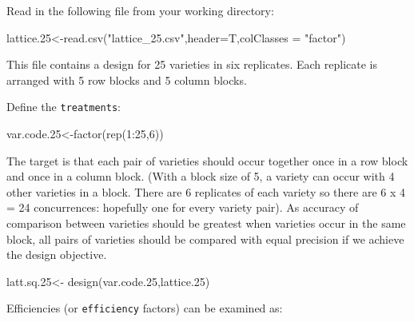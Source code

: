 \documentclass[
]{book}
\newenvironment{Shaded}{\begin{snugshade}}{\end{snugshade}}
\newcommand{\AttributeTok}[1]{\textcolor[rgb]{0.77,0.63,0.00}{#1}}
\newcommand{\DecValTok}[1]{\textcolor[rgb]{0.00,0.00,0.81}{#1}}
\newcommand{\FloatTok}[1]{\textcolor[rgb]{0.00,0.00,0.81}{#1}}
\newcommand{\FunctionTok}[1]{\textcolor[rgb]{0.00,0.00,0.00}{#1}}
\newcommand{\NormalTok}[1]{#1}
\newcommand{\OtherTok}[1]{\textcolor[rgb]{0.56,0.35,0.01}{#1}}
\newcommand{\SpecialCharTok}[1]{\textcolor[rgb]{0.00,0.00,0.00}{#1}}
\newcommand{\StringTok}[1]{\textcolor[rgb]{0.31,0.60,0.02}{#1}}
\begin{document}
Read in the following file from your working directory:

\begin{Shaded}
\begin{Highlighting}[]
\NormalTok{lattice}\FloatTok{.25}\OtherTok{\textless{}{-}}\FunctionTok{read.csv}\NormalTok{(}\StringTok{"lattice\_25.csv"}\NormalTok{,}\AttributeTok{header=}\NormalTok{T,}\AttributeTok{colClasses =} \StringTok{"factor"}\NormalTok{)}
\end{Highlighting}
\end{Shaded}

This file contains a design for 25 varieties in six replicates. Each replicate is arranged with 5 row blocks and 5 column blocks.

Define the \texttt{treatments}:

\begin{Shaded}
\begin{Highlighting}[]
\NormalTok{var.code}\FloatTok{.25}\OtherTok{\textless{}{-}}\FunctionTok{factor}\NormalTok{(}\FunctionTok{rep}\NormalTok{(}\DecValTok{1}\SpecialCharTok{:}\DecValTok{25}\NormalTok{,}\DecValTok{6}\NormalTok{))}
\end{Highlighting}
\end{Shaded}

The target is that each pair of varieties should occur together once in a row block and once in a column block. (With a block size of 5, a variety can occur with 4 other varieties in a block. There are 6 replicates of each variety so there are 6 x 4 = 24 concurrences: hopefully one for every variety pair). As accuracy of comparison between varieties should be greatest when varieties occur in the same block, all pairs of varieties should be compared with equal precision if we achieve the design objective.

\begin{Shaded}
\begin{Highlighting}[]
\NormalTok{latt.sq}\FloatTok{.25}\OtherTok{\textless{}{-}} \FunctionTok{design}\NormalTok{(var.code}\FloatTok{.25}\NormalTok{,lattice}\FloatTok{.25}\NormalTok{)}
\end{Highlighting}
\end{Shaded}

Efficiencies (or \texttt{efficiency} factors) can be examined as:

\begin{Shaded}
\end{Shaded}
\end{document}
